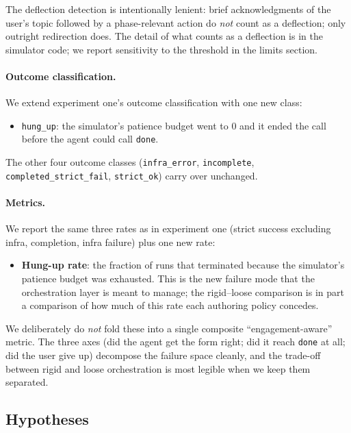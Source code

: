 \documentclass[11pt,a4paper]{article}
\begin{document}
The deflection detection is intentionally lenient: brief acknowledgments of the user's topic followed by a phase-relevant action do \emph{not} count as a deflection; only outright redirection does. The detail of what counts as a deflection is in the simulator code; we report sensitivity to the threshold in the limits section.

\paragraph{Outcome classification.}
We extend experiment one's outcome classification with one new class:

\begin{itemize}[noitemsep]
    \item \texttt{hung\_up}: the simulator's patience budget went to $0$ and it ended the call before the agent could call \texttt{done}.
\end{itemize}

The other four outcome classes (\texttt{infra\_error}, \texttt{incomplete}, \texttt{completed\_strict\_fail}, \texttt{strict\_ok}) carry over unchanged.

\paragraph{Metrics.} We report the same three rates as in experiment one (strict success excluding infra, completion, infra failure) plus one new rate:

\begin{itemize}[noitemsep]
    \item \textbf{Hung-up rate}: the fraction of runs that terminated because the simulator's patience budget was exhausted. This is the new failure mode that the orchestration layer is meant to manage; the rigid--loose comparison is in part a comparison of how much of this rate each authoring policy concedes.
\end{itemize}

We deliberately do \emph{not} fold these into a single composite ``engagement-aware'' metric. The three axes (did the agent get the form right; did it reach \texttt{done} at all; did the user give up) decompose the failure space cleanly, and the trade-off between rigid and loose orchestration is most legible when we keep them separated.

\subsection{Hypotheses}
\end{document}
